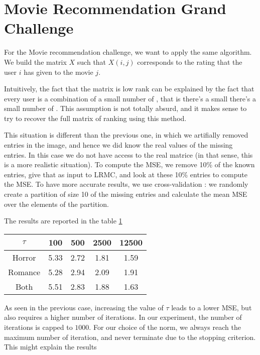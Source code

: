 \documentclass[a4paper, 11pt]{article}
\begin{document}
\clearpage
\section{Movie Recommendation Grand Challenge}

For the Movie recommendation challenge, we want to apply the same
algorithm. We build the matrix $X$ such that $X(i, j)$ corresponds to
the rating that the user $i$ has given to the movie $j$.

Intuitively, the fact that the matrix is low rank can be explained by
the fact that every user is a combination of a small number of
, that is there's a small there's a small number of
. This assumption is not totally absurd, and it makes
sense to try to recover the full matrix of ranking using this method.

This situation is different than the previous one, in which we
artifially removed entries in the image, and hence we did know the
real values of the missing entries. In this case we do not have access
to the real matrice (in that sense, this is a more realistic
situation). To compute the MSE, we remove 10\% of the known entries,
give that as input to LRMC, and look at these 10\% entries to compute
the MSE. To have more accurate results, we use cross-validation : we
randomly create a partition of size 10 of the missing entries and
calculate the mean MSE over the elements of the partition.

The results are reported in the table \ref{tab:mse-movies}


\begin{table}[h!]
  \centering
  \begin{tabular}{| c | c | c | c | c |}
    \hline
    $\tau$ & 100 & 500 & 2500 & 12500 \\
    \hline
    Horror  & 5.33 & 2.72 & 1.81 & 1.59 \\
    Romance & 5.28 & 2.94 & 2.09 & 1.91 \\
    Both    & 5.51 & 2.83 & 1.88 & 1.63 \\
    \hline
  \end{tabular}
   \label{tab:mse-movies}
\end{table}

As seen in the previous case, increasing the value of $\tau$ leads to
a lower MSE, but also requires a higher number of iterations. In our
experiment, the number of iterations is capped to $1000$. For our
choice of the norm, we always reach the maximum number of iteration,
and never terminate due to the stopping criterion. This might explain
the results
\end{document}
